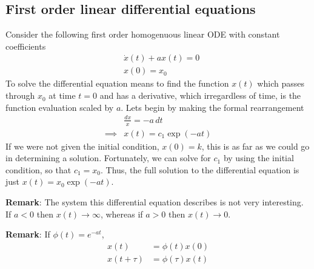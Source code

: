 \documentclass[a4paper,11pt]{exam}
\newcounter{ct}
\begin{document}
\begin{questions}
\subsection{First order linear differential equations}
Consider the following first order homogenuous linear ODE with constant coefficients
\begin{align}
    &\dot{x}(t) + a x(t) = 0\\
    &x(0) = x_0
\end{align}
To solve the differential equation means to find the function $x(t)$ which passes through $x_0$ at time $t=0$ and has a derivative, which irregardless of time, is the function evaluation scaled by $a$.  Lets begin by making the formal rearrangement
\begin{align}
    &\frac{dx}{x} = - a \, dt\\
    \implies &x(t) =  c_1 \exp(-at)
\end{align}
If we were not given the initial condition, $x(0)=k$, this is as far as we could go in determining a solution.  Fortunately, we can solve for $c_1$ by using the initial condition, so that $c_1 = x_0$.  Thus, the full solution to the differential equation is just $x(t) = x_0 \exp(-at)$.  

\textbf{Remark}: The system this differential equation describes is not very interesting.  If $a < 0$ then $x(t) \rightarrow \infty$, whereas if $a > 0$ then $x(t) \rightarrow 0$.

\textbf{Remark}: If $\phi(t) = e^{-at}$,
\begin{align}
    x(t) &= \phi(t)x(0)
    \\
    x(t+\tau) &= \phi(\tau)x(t)
\end{align}


\clearpage

\end{questions}
\end{document}
